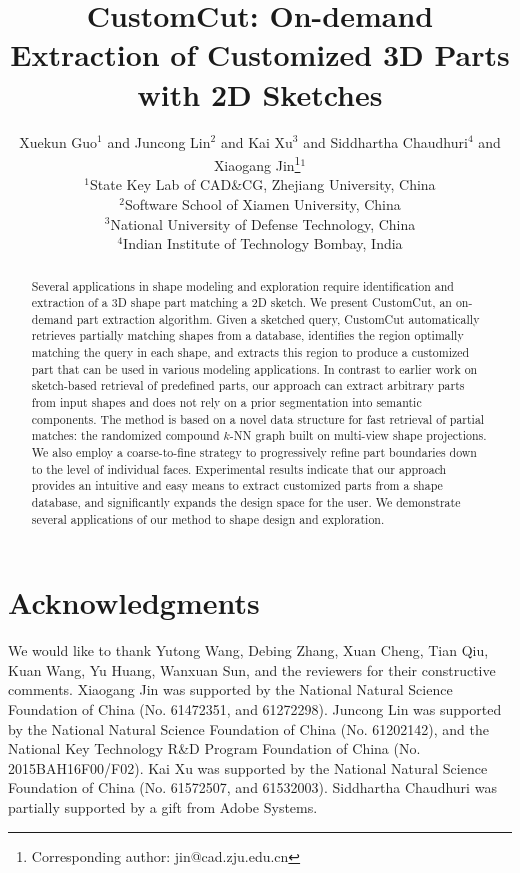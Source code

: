 \documentclass{egpubl}
\title[CustomCut]{CustomCut: On-demand Extraction of Customized 3D Parts with 2D Sketches}
\author[X. Guo, J. Lin, K. Xu, S. Chaudhuri \& X. Jin]
       {Xuekun Guo$^{1}$
        and Juncong Lin$^{2}$
        and Kai Xu$^{3}$
        and Siddhartha Chaudhuri$^{4}$
        and Xiaogang Jin\thanks{Corresponding author: jin@cad.zju.edu.cn}$^{1}$
        \\
         $^1$State Key Lab of CAD\&CG, Zhejiang University, China\\
         $^2$Software School of Xiamen University, China \\
         $^3$National University of Defense Technology, China \\
         $^4$Indian Institute of Technology Bombay, India
       }
\def\ProjName{CustomCut}
\begin{document}
\maketitle

\begin{abstract}
Several applications in shape modeling and exploration require identification and extraction of a 3D shape part matching a 2D sketch. We present {\ProjName}, an on-demand part extraction algorithm. Given a sketched query, {\ProjName} automatically retrieves partially matching shapes from a database, identifies the region optimally matching the query in each shape, and extracts this region to produce a customized part that can be used in various modeling applications. In contrast to earlier work on sketch-based retrieval of predefined parts, our approach can extract arbitrary parts from input shapes and does not rely on a prior segmentation into semantic components. The method is based on a novel data structure for fast retrieval of partial matches: the randomized compound $k$-NN graph built on multi-view shape projections. We also employ a coarse-to-fine strategy to progressively refine part boundaries down to the level of individual faces. Experimental results indicate that our approach provides an intuitive and easy means to extract customized parts from a shape database, and significantly expands the design space for the user. We demonstrate several applications of our method to shape design and exploration.
\begin{classification} %
\end{classification}

\end{abstract}











\section*{Acknowledgments}
We would like to thank Yutong Wang, Debing Zhang, Xuan Cheng, Tian Qiu, Kuan Wang, Yu Huang, Wanxuan Sun, and the reviewers for their constructive comments.
Xiaogang Jin was supported by the National Natural Science Foundation of China (No. 61472351, and 61272298).
Juncong Lin was supported by the National Natural Science Foundation of China (No. 61202142), and the National Key Technology R\&D Program Foundation of China (No. 2015BAH16F00/F02).
Kai Xu was supported by the National Natural Science Foundation of China (No. 61572507, and 61532003).
Siddhartha Chaudhuri was partially supported by a gift from Adobe Systems.



\end{document}
